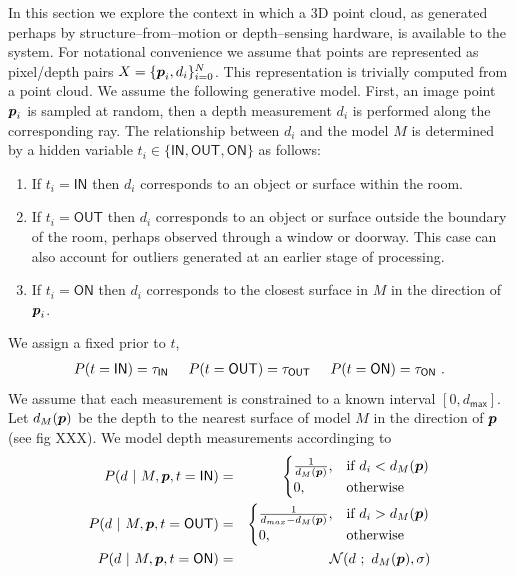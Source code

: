 \documentclass{article}
\newcommand\Model{M}
\newcommand\Pixel{\vect{p}}
\newcommand\Depth{d}
\newcommand\tIN{\tau_{\textsf{IN}}}
\newcommand\tOUT{\tau_{\textsf{OUT}}}
\newcommand\tON{\tau_{\textsf{ON}}}
\begin{document}
In this section we explore the context in which a 3D point cloud, as
generated perhaps by structure--from--motion or depth--sensing
hardware, is available to the system. For notational convenience we
assume that points are represented as pixel/depth pairs
$X=\{\Pixel_i,\Depth_i\}_{i=0}^N$. This representation is trivially
computed from a point cloud. We assume the following generative
model. First, an image point $\Pixel_i$ is sampled at random, then a
depth measurement $d_i$ is performed along the corresponding ray. The
relationship between $d_i$ and the model $M$ is determined by a hidden
variable $t_i\in\{\textsf{IN},\textsf{OUT},\textsf{ON}\}$ as follows:
\begin{enumerate}
  \item{If $t_i=\textsf{IN}$ then $\Depth_i$ corresponds to an object
    or surface within the room.}
  \item{If $t_i=\textsf{OUT}$ then $\Depth_i$ corresponds to an object
    or surface outside the boundary of the room, perhaps observed
    through a window or doorway. This case can also account for
    outliers generated at an earlier stage of processing.}
  \item{If $t_i=\textsf{ON}$ then $\Depth_i$ corresponds to the
    closest surface in $M$ in the direction of $\Pixel_i$.}
\end{enumerate}
We assign a fixed prior to $t$,
\begin{eqnarray}
  P(t=\textsf{IN}) = \tIN \hspace{0.5cm} 
  P(t=\textsf{OUT}) = \tOUT \hspace{0.5cm} 
  P(t=\textsf{ON}) = \tON ~.
\end{eqnarray}
We assume that each measurement is constrained to a known interval
$\left[0,d_{\textsf{max}}\right]$. Let $d_\Model(\Pixel)$ be the
depth to the nearest surface of model $M$ in the direction of
$\Pixel$ (see fig XXX). We model depth measurements accordinging to
\begin{eqnarray}
  \label{eq:x-inside}
  P(d~|~\Model,\Pixel,t=\textsf{IN}) &=&
  \begin{cases}
    \frac{1}{d_\Model(\Pixel)}, & \mbox{if } d_i < d_\Model(\Pixel) \\
    0, & \mbox{otherwise} \\
  \end{cases}\\
  \label{eq:x-outside}
  P(d~|~\Model,\Pixel,t=\textsf{OUT}) &=&
  \begin{cases}
    \frac{1}{d_{max}-d_\Model(\Pixel)}, & \mbox{if } d_i > d_\Model(\Pixel) \\
    0, & \mbox{otherwise} \\
  \end{cases}\\
  P(d ~|~ \Model,\Pixel,t=\textsf{ON}) &=&
  \mathcal{N}(d~;~d_\Model(\Pixel),\sigma)
\end{eqnarray}
\end{document}
